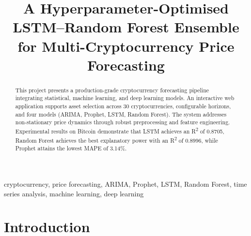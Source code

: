 \documentclass[conference]{IEEEtran}
\begin{document}
\title{A Hyperparameter-Optimised LSTM–Random Forest Ensemble for Multi-Cryptocurrency Price Forecasting}

\author{


\and


}
\maketitle

\begin{abstract}
This project presents a production-grade cryptocurrency forecasting pipeline integrating statistical, machine learning, and deep learning models. An interactive web application supports asset selection across 30 cryptocurrencies, configurable horizons, and four models (ARIMA, Prophet, LSTM, Random Forest). The system addresses non-stationary price dynamics through robust preprocessing and feature engineering. Experimental results on Bitcoin demonstrate that LSTM achieves an R\textsuperscript{2} of 0.8705, Random Forest achieves the best explanatory power with an R\textsuperscript{2} of 0.8996, while Prophet attains the lowest MAPE of 3.14\%.
\end{abstract}

\begin{IEEEkeywords}
cryptocurrency, price forecasting, ARIMA, Prophet, LSTM, Random Forest, time series analysis, machine learning, deep learning
\end{IEEEkeywords}


\section{Introduction}
\end{document}
